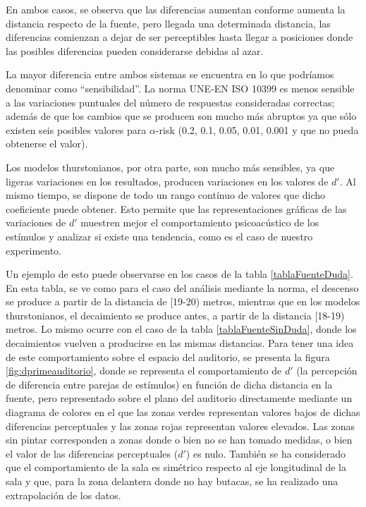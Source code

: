 \documentclass[11pt,a4paper,twoside]{book}
\begin{document}
            En ambos casos, se observa que las diferencias aumentan conforme aumenta la distancia respecto de la fuente, pero llegada una determinada distancia, las diferencias comienzan a dejar de ser perceptibles hasta llegar a posiciones donde las posibles diferencias pueden considerarse debidas al azar.
            
            La mayor diferencia entre ambos sistemas se encuentra en lo que podríamos denominar como ``sensibilidad''. La norma UNE-EN ISO 10399 es menos sensible a las variaciones puntuales del número de respuestas consideradas correctas; además de que los cambios que se producen son mucho más abruptos ya que sólo existen seis posibles valores para $\alpha$-risk (0.2, 0.1, 0.05, 0.01, 0.001 y que no pueda obtenerse el valor).
            
            Los modelos thurstonianos, por otra parte, son mucho más sensibles, ya que ligeras variaciones en los resultados, producen variaciones en los valores de $d'$. Al mismo tiempo, se dispone de todo un rango contínuo de valores que dicho coeficiente puede obtener. Esto permite que las representaciones gráficas de las variaciones de $d'$ muestren mejor el comportamiento psicoacústico de los estímulos y analizar si existe una tendencia, como es el caso de nuestro experimento.
            
            Un ejemplo de esto puede observarse en los casos de la tabla \ref{tablaFuenteDuda}. En esta tabla, se ve como para el caso del análisis mediante la norma, el descenso se produce a partir de la distancia de [19-20) metros, mientras que en los modelos thurstonianos, el decaimiento se produce antes, a partir de la distancia [18-19) metros. Lo mismo ocurre con el caso de la tabla \ref{tablaFuenteSinDuda}, donde los decaimientos vuelven a producirse en las mismas distancias. Para tener una idea de este comportamiento sobre el espacio del auditorio, se presenta la figura \ref{fig:dprimeauditorio}, donde se representa el comportamiento de $d'$ (la percepción de diferencia entre parejas de estímulos) en función de dicha distancia en la fuente, pero representado sobre el plano del auditorio directamente mediante un diagrama de colores en el que las zonas verdes representan valores bajos de dichas diferencias perceptuales y las zonas rojas representan valores elevados. Las zonas sin pintar corresponden a zonas donde o bien no se han tomado medidas, o bien el valor de las diferencias perceptuales ($d'$) es nulo. También se ha considerado que el comportamiento de la sala es simétrico respecto al eje longitudinal de la sala y que, para la zona delantera donde no hay butacas, se ha realizado una extrapolación de los datos.
            
\end{document}
